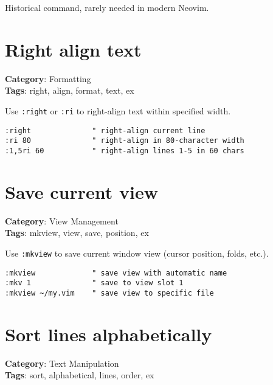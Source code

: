 {{{{Historical command, rarely needed in modern Neovim.

\section{Right align text}

\textbf{Category}: Formatting\\ \textbf{Tags}: right, align, format, text, ex
\vspace{0.5cm}

Use {\footnotesize \Verb§:right§} or {\footnotesize \Verb§:ri§} to right-align text within specified width.

\begin{Exa*}{}
\begin{Verbatim}[fontsize=\footnotesize, breaklines, breakanywhere]
:right              " right-align current line
:ri 80              " right-align in 80-character width
:1,5ri 60           " right-align lines 1-5 in 60 chars
\end{Verbatim}
\end{Exa*}

\section{Save current view}

\textbf{Category}: View Management\\ \textbf{Tags}: mkview, view, save, position, ex
\vspace{0.5cm}

Use {\footnotesize \Verb§:mkview§} to save current window view (cursor position, folds, etc.).

\begin{Exa*}{}
\begin{Verbatim}[fontsize=\footnotesize, breaklines, breakanywhere]
:mkview             " save view with automatic name
:mkv 1              " save to view slot 1
:mkview ~/my.vim    " save view to specific file
\end{Verbatim}
\end{Exa*}

\section{Sort lines alphabetically}

\textbf{Category}: Text Manipulation\\ \textbf{Tags}: sort, alphabetical, lines, order, ex
\vspace{0.5cm}

}}}}
